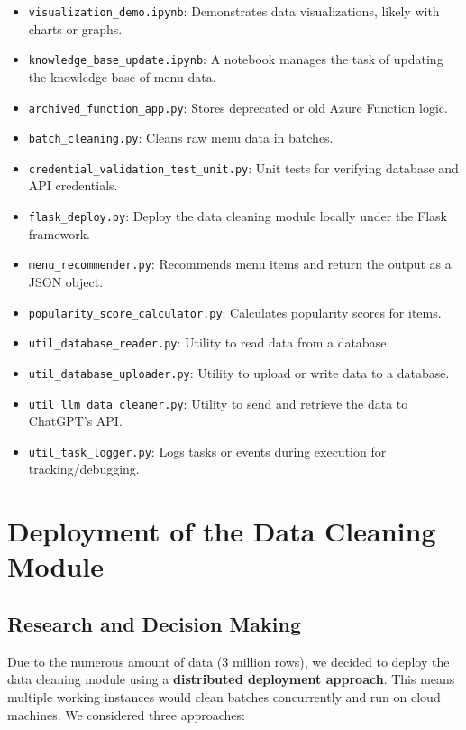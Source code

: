 \documentclass[
  11pt,
  a4paper,
  DIV=11,
  numbers=noendperiod]{scrartcl}
\providecommand{\tightlist}{%
  \setlength{\itemsep}{0pt}\setlength{\parskip}{0pt}}\usepackage{longtable,booktabs,array}
\begin{document}
\begin{itemize}
\tightlist
\item
  \texttt{visualization\_demo.ipynb}: Demonstrates data visualizations,
  likely with charts or graphs.
\item
  \texttt{knowledge\_base\_update.ipynb}: A notebook manages the task of
  updating the knowledge base of menu data.
\item
  \texttt{archived\_function\_app.py}: Stores deprecated or old Azure
  Function logic.
\item
  \texttt{batch\_cleaning.py}: Cleans raw menu data in batches.
\item
  \texttt{credential\_validation\_test\_unit.py}: Unit tests for
  verifying database and API credentials.
\item
  \texttt{flask\_deploy.py}: Deploy the data cleaning module locally
  under the Flask framework.
\item
  \texttt{menu\_recommender.py}: Recommends menu items and return the
  output as a JSON object.
\item
  \texttt{popularity\_score\_calculator.py}: Calculates popularity
  scores for items.
\item
  \texttt{util\_database\_reader.py}: Utility to read data from a
  database.
\item
  \texttt{util\_database\_uploader.py}: Utility to upload or write data
  to a database.
\item
  \texttt{util\_llm\_data\_cleaner.py}: Utility to send and retrieve the
  data to ChatGPT's API.
\item
  \texttt{util\_task\_logger.py}: Logs tasks or events during execution
  for tracking/debugging.
\end{itemize}

\section{Deployment of the Data Cleaning
Module}\label{deployment-of-the-data-cleaning-module}

\subsection{Research and Decision
Making}\label{research-and-decision-making}

Due to the numerous amount of data (3 million rows), we decided to
deploy the data cleaning module using a \textbf{distributed deployment
approach}. This means multiple working instances would clean batches
concurrently and run on cloud machines. We considered three approaches:
\end{document}
